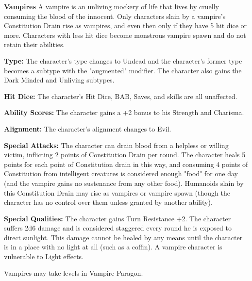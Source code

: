 \textbf{Vampires}
A vampire is an unliving mockery of life that lives by cruelly consuming the blood of the innocent. Only characters slain by a vampire's Constitution Drain rise as vampires, and even then only if they have 5 hit dice or more. Characters with less hit dice become monstrous vampire spawn and do not retain their abilities.
\begin{itemize*}
\item \textbf{Type:} The character's type changes to Undead and the character's former type becomes a subtype with the "augmented" modifier. The character also gains the Dark Minded and Unliving subtypes.
\item \textbf{Hit Dice:} The character's Hit Dice, BAB, Saves, and skills are all unaffected.
\item \textbf{Ability Scores:} The character gains a +2 bonus to his Strength and Charisma.
\item \textbf{Alignment:} The character's alignment changes to Evil.
\item \textbf{Special Attacks:} The character can drain blood from a helpless or willing victim, inflicting 2 points of Constitution Drain per round. The character heals 5 points for each point of Constitution drain in this way, and consuming 4 points of Constitution from intelligent creatures is considered enough "food" for one day (and the vampire gains no sustenance from any other food). Humanoids slain by this Constitution Drain may rise as vampires or vampire spawn (though the character has no control over them unless granted by another ability).
\item \textbf{Special Qualities:} The character gains Turn Resistance +2. The character suffers 2d6 damage and is considered staggered every round he is exposed to direct sunlight. This damage cannot be healed by any means until the character is in a place with no light at all (such as a coffin). A vampire character is vulnerable to Light effects.
\end{itemize*}
Vampires may take levels in Vampire Paragon.

